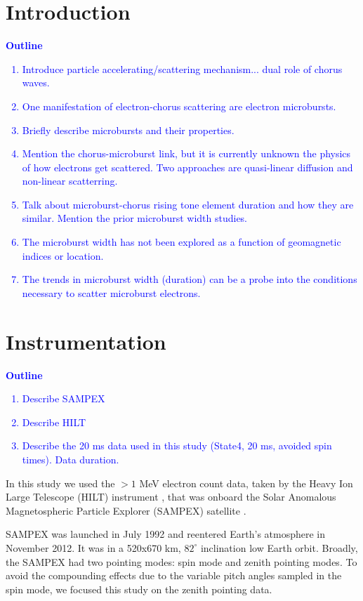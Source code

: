 \documentclass[draft]{agujournal2019}
\begin{document}
\section{Introduction}\label{intro}
\textcolor{blue}{
\textbf{Outline}
\begin{enumerate}
    \item Introduce particle accelerating/scattering mechanism... dual role of chorus waves.
    \item One manifestation of electron-chorus scattering are electron microbursts.
    \item Briefly describe microbursts and their properties.
    \item Mention the chorus-microburst link, but it is currently unknown the physics of how electrons get scattered. Two approaches are quasi-linear diffusion and non-linear scatterring.
    \item Talk about microburst-chorus rising tone element duration and how they are similar. Mention the prior microburst width studies.
    \item The microburst width has not been explored as a function of geomagnetic indices or location.
    \item The trends in microburst width (duration) can be a probe into the conditions necessary to scatter microburst electrons.
\end{enumerate}
}

\section{Instrumentation}\label{instrumentation}
\textcolor{blue}{
\textbf{Outline}
\begin{enumerate}
    \item Describe SAMPEX
    \item Describe HILT
    \item Describe the 20 ms data used in this study (State4, 20 ms, avoided spin times). Data duration.
\end{enumerate}
}
In this study we used the $>1$ MeV electron count data, taken by the Heavy Ion Large Telescope (HILT) instrument \cite{Klecker1993}, that was onboard the Solar Anomalous Magnetospheric Particle Explorer (SAMPEX) satellite \cite{Baker1993}. 

SAMPEX was launched in July 1992 and reentered Earth's atmosphere in November 2012. It was in a 520x670 km, $82^\circ$ inclination low Earth orbit. Broadly, the SAMPEX had two pointing modes: spin mode and zenith pointing modes. To avoid the compounding effects due to the variable pitch angles sampled in the spin mode, we focused this study on the zenith pointing data.
\end{document}
